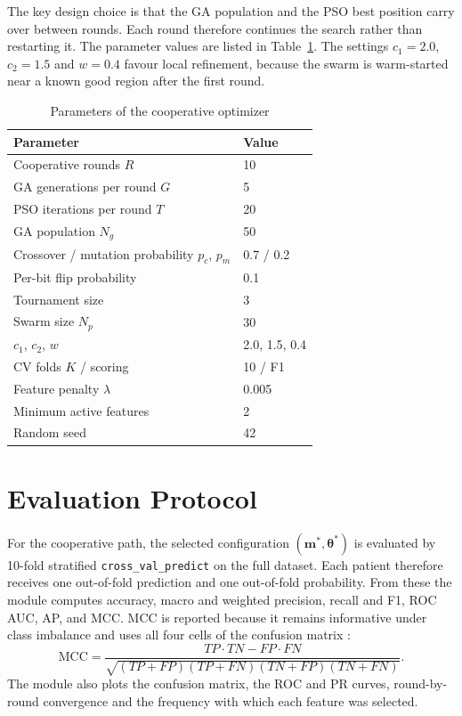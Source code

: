 \documentclass[MTech]{ugthesis}
\begin{document}
The key design choice is that the GA population and the PSO best position carry over between rounds. Each round therefore continues the search rather than restarting it. The parameter values are listed in Table~\ref{tab:params}. The settings $c_1=2.0$, $c_2=1.5$ and $w=0.4$ favour local refinement, because the swarm is warm-started near a known good region after the first round.

\begin{table}[htpb]
\small
\renewcommand{\arraystretch}{1.25}
\caption{Parameters of the cooperative optimizer}
\label{tab:params}
\begin{tabular}{|p{6.5cm}|p{2.5cm}|}
\hline
\textbf{Parameter} & \textbf{Value} \\ \hline
Cooperative rounds $R$ & 10 \\ \hline
GA generations per round $G$ & 5 \\ \hline
PSO iterations per round $T$ & 20 \\ \hline
GA population $N_g$ & 50 \\ \hline
Crossover / mutation probability $p_c$, $p_m$ & 0.7 / 0.2 \\ \hline
Per-bit flip probability & 0.1 \\ \hline
Tournament size & 3 \\ \hline
Swarm size $N_p$ & 30 \\ \hline
$c_1$, $c_2$, $w$ & 2.0, 1.5, 0.4 \\ \hline
CV folds $K$ / scoring & 10 / F1 \\ \hline
Feature penalty $\lambda$ & 0.005 \\ \hline
Minimum active features & 2 \\ \hline
Random seed & 42 \\ \hline
\end{tabular}
\end{table}

\section{Evaluation Protocol}
For the cooperative path, the selected configuration $(\mathbf{m}^{*},\boldsymbol{\theta}^{*})$ is evaluated by 10-fold stratified \texttt{cross\_val\_predict} on the full dataset. Each patient therefore receives one out-of-fold prediction and one out-of-fold probability. From these the module computes accuracy, macro and weighted precision, recall and F1, ROC \ac{AUC}, \ac{AP}, and \ac{MCC}. MCC is reported because it remains informative under class imbalance and uses all four cells of the confusion matrix \citep{chicco2020mcc}:
\begin{equation}
\mathrm{MCC} = \frac{TP\cdot TN - FP\cdot FN}{\sqrt{(TP+FP)(TP+FN)(TN+FP)(TN+FN)}}.
\end{equation}
The module also plots the confusion matrix, the ROC and PR curves, round-by-round convergence and the frequency with which each feature was selected.
\end{document}
